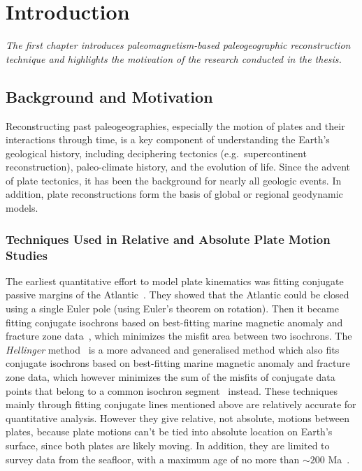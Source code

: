 \chapter{Introduction}\label{chap:Intro}
\textit{The first chapter introduces paleomagnetism-based paleogeographic
reconstruction technique and highlights the motivation of the research conducted
in the thesis.}
\vfill
\minitoc\newpage

\section{Background and Motivation}

Reconstructing past paleogeographies, especially the motion of plates and their
interactions through time, is a key component of understanding the Earth's
geological history, including deciphering tectonics (e.g.\ supercontinent
reconstruction), paleo-climate history, and the evolution of life. Since the
advent of plate tectonics, it has been the background for nearly all geologic
events. In addition, plate reconstructions form the basis of global or regional
geodynamic models.

\subsection{Techniques Used in Relative and Absolute Plate Motion Studies}

The earliest quantitative effort to model plate kinematics was fitting conjugate
passive margins of the Atlantic~\citep{B65,W07}. They showed that the Atlantic
could be closed using a single Euler pole (using Euler's theorem on rotation).
Then it became fitting conjugate isochrons based on best-fitting marine magnetic
anomaly and fracture zone data~\citep{M71}, which minimizes the misfit area
between two isochrons. The \emph{Hellinger} method~\citep{H81} is a more advanced
and generalised method which also fits conjugate isochrons based on best-fitting
marine magnetic anomaly and fracture zone data, which however minimizes the sum
of the misfits of conjugate data points that belong to a common isochron
segment~\citep{W07} instead. These techniques mainly through fitting conjugate
lines mentioned above are relatively accurate for quantitative analysis. However
they give relative, not absolute, motions between plates, because plate motions
can't be tied into absolute location on Earth's surface, since both plates are
likely moving. In addition, they are limited to survey data from the seafloor,
with a maximum age of no more than ${\sim}200$ Ma~\citep{M08}.

